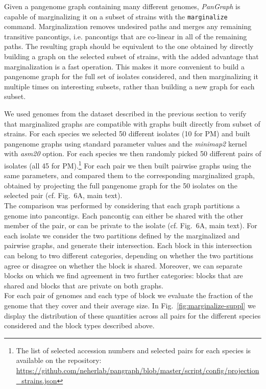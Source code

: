\documentclass[aps,rmp,reprint,superscriptaddress,notitlepage,10pt,onecolumn]{revtex4-1}
\begin{document}
Given a pangenome graph containing many different genomes, \textit{PanGraph} is capable of marginalizing it on a subset of strains with the \verb|marginalize| command. Marginalization removes undesired paths and merges any remaining transitive pancontigs, i.e. pancontigs that are co-linear in all of the remaining paths.
The resulting graph should be equivalent to the one obtained by directly building a graph on the selected subset of strains, with the added advantage that marginalization is a fast operation. This makes it more convenient to build a pangenome graph for the full set of isolates considered, and then marginalizing it multiple times on interesting subsets, rather than building a new graph for each subset.

We used genomes from the dataset described in the previous section to verify that marginalized graphs are compatible with graphs built directly from subset of strains. For each species we selected 50 different isolates (10 for PM) and built pangenome graphs using standard parameter values and the \textit{minimap2} kernel with \textit{asm20} option. For each species we then randomly picked 50 different pairs of isolates (all 45 for PM).\footnote{The list of selected accession numbers and selected pairs for each species is available on the repository: \url{https://github.com/neherlab/pangraph/blob/master/script/config/projection_strains.json}} For each pair we then built pairwise graphs using the same parameters, and compared them to the corresponding marginalized graph, obtained by projecting the full pangenome graph for the 50 isolates on the selected pair (cf. Fig.~6A, main text).\\
The comparison was performed by considering that each graph partitions a genome into pancontigs. Each pancontig can either be shared with the other member of the pair, or can be private to the isolate (cf. Fig.~6A, main text). For each isolate we consider the two partitions defined by the marginalized and pairwise graphs, and generate their intersection. Each block in this intersection can belong to two different categories, depending on whether the two partitions agree or disagree on whether the block is shared. Moreover, we can separate blocks on which we find agreement in two further categories: blocks that are shared and blocks that are private on both graphs.\\
For each pair of genomes and each type of block we evaluate the fraction of the genome that they cover and their average size. In Fig.~\ref{fig:marginalize-suppl} we display the distribution of these quantities across all pairs for the different species considered and the block types described above.\\
\end{document}
